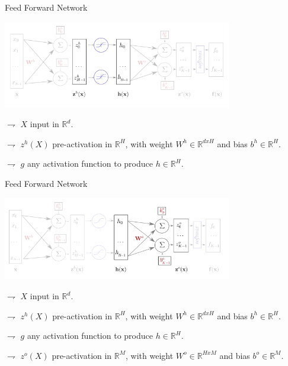 \documentclass[9pt]{beamer}
\newcommand\R{\mathds{R}}
\begin{document}
\begin{frame}{Feed Forward Network}

\begin{center}
\includegraphics[width = 0.75\textwidth]{ffnn2.png}
\end{center}

$\rightharpoondown$ $X$ \alert{input in $\R^d$}.

$\rightharpoondown$ $z^h(X)$ \alert{pre-activation in $\R^H$}, with \alert{weight $W^h\in\R^{dxH}$} and \alert{bias $b^h\in\R^H$}.

$\rightharpoondown$ $g$ \alert{any activation function} to produce $h\in\R^H$.
\end{frame}

\begin{frame}{Feed Forward Network}

\begin{center}
\includegraphics[width = 0.75\textwidth]{ffnn3.png}
\end{center}

$\rightharpoondown$ $X$ \alert{input in $\R^d$}.

$\rightharpoondown$ $z^h(X)$ \alert{pre-activation in $\R^H$}, with \alert{weight $W^h\in\R^{dxH}$} and \alert{bias $b^h\in\R^H$}.

$\rightharpoondown$ $g$ \alert{any activation function} to produce $h\in\R^H$.

$\rightharpoondown$ $z^o(X)$ \alert{pre-activation in $\R^M$}, with \alert{weight $W^o\in\R^{HxM}$} and \alert{bias $b^o\in\R^M$}.

\end{frame}
\end{document}
